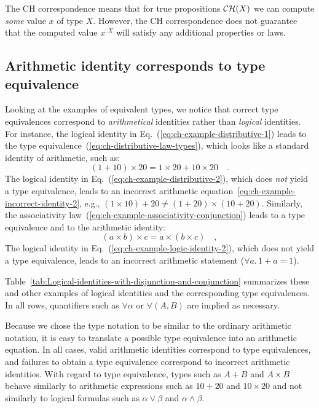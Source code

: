 The CH correspondence means that for true propositions ${\cal CH}(X)$
we can compute \emph{some} value $x$ of type $X$. However, the CH
correspondence does not guarantee that the computed value $x^{:X}$
will satisfy any additional properties or laws.

\subsection{Arithmetic identity corresponds to type equivalence}

Looking at the examples of equivalent types, we notice that correct
type equivalences correspond to \emph{arithmetical} identities rather
than \emph{logical} identities. For instance, the logical identity
in Eq.~(\ref{eq:ch-example-distributive-1}) leads to the type equivalence~(\ref{eq:ch-distributive-law-types}),
which looks like a standard identity of arithmetic, such as:
\[
(1+10)\times20=1\times20+10\times20\quad.
\]
The logical identity in Eq.~(\ref{eq:ch-example-distributive-2}),
which does \emph{not} yield a type equivalence, leads to an incorrect
arithmetic equation~\ref{eq:ch-example-incorrect-identity-2}, e.g.,
$\left(1\times10\right)+20\neq\left(1+20\right)\times\left(10+20\right)$.
Similarly, the associativity law~(\ref{eq:ch-example-associativity-conjunction})
leads to a type equivalence and to the arithmetic identity:
\[
\left(a\times b\right)\times c=a\times\left(b\times c\right)\quad,
\]
The logical identity in Eq.~(\ref{eq:ch-example-logic-identity-2}),
which does not yield a type equivalence, leads to an incorrect arithmetic
statement ($\forall a.\,1+a=1$).

Table~\ref{tab:Logical-identities-with-disjunction-and-conjunction}
summarizes these and other examples of logical identities and the
corresponding type equivalences. In all rows, quantifiers such as
$\forall\alpha$ or $\forall(A,B)$ are implied as necessary.

Because we chose the type notation to be similar to the ordinary arithmetic
notation, it is easy to translate a possible type equivalence into
an arithmetic equation. In all cases, valid arithmetic identities
correspond to type equivalences, and failures to obtain a type equivalence
correspond to incorrect arithmetic identities. With regard to type
equivalence, types such as $A+B$ and $A\times B$ behave similarly
to arithmetic expressions such as $10+20$ and $10\times20$ and not
similarly to logical formulas such as $\alpha\vee\beta$ and $\alpha\wedge\beta$.

